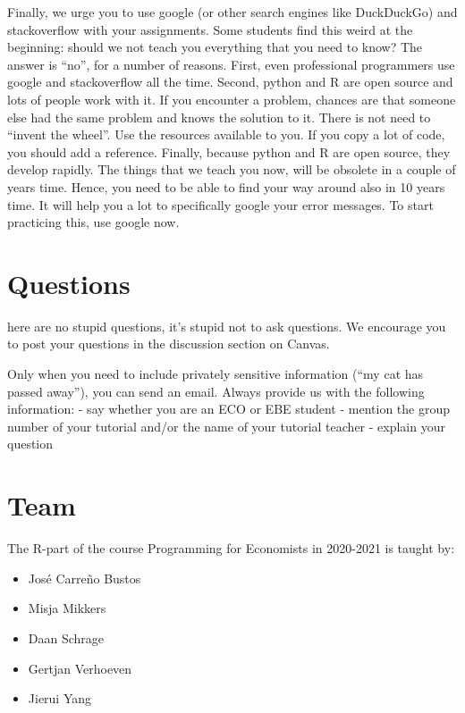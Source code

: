 \documentclass[
]{book}
\providecommand{\tightlist}{%
  \setlength{\itemsep}{0pt}\setlength{\parskip}{0pt}}
\begin{document}
Finally, we urge you to use google (or other search engines like DuckDuckGo) and stackoverflow with your assignments. Some students find this weird at the beginning: should we not teach you everything that you need to know? The answer is ``no'', for a number of reasons. First, even professional programmers use google and stackoverflow all the time. Second, python and R are open source and lots of people work with it. If you encounter a problem, chances are that someone else had the same problem and knows the solution to it. There is not need to ``invent the wheel''. Use the resources available to you. If you copy a lot of code, you should add a reference. Finally, because python and R are open source, they develop rapidly. The things that we teach you now, will be obsolete in a couple of years time. Hence, you need to be able to find your way around also in 10 years time. It will help you a lot to specifically google your error messages.
To start practicing this, use google now.

\hypertarget{questions}{%
\section{Questions}\label{questions}}

here are no stupid questions, it's stupid not to ask questions. We encourage you to post your questions in the discussion section on Canvas.

Only when you need to include privately sensitive information (``my cat has passed away''), you can send an email. Always provide us with the following information: - say whether you are an ECO or EBE student - mention the group number of your tutorial and/or the name of your tutorial teacher - explain your question

\hypertarget{team}{%
\section{Team}\label{team}}

The R-part of the course Programming for Economists in 2020-2021 is taught by:

\begin{itemize}
\tightlist
\item
  José Carreño Bustos
\item
  Misja Mikkers
\item
  Daan Schrage
\item
  Gertjan Verhoeven
\item
  Jierui Yang
\end{itemize}
\end{document}
